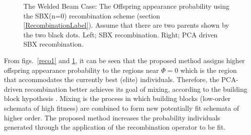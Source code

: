 \begin{figure}[h!]
\begin{minipage}[b]{0.5\linewidth}
 \centering
\end{minipage}
\begin{minipage}[b]{0.5\linewidth}
 \centering
\end{minipage}
\caption{The Welded Beam Case: The  Offspring appearance probability using the SBX(n=0) recombination scheme (section \ref{RecombinationLabel}). Assume that there are two  parents shown by the two black dots. Left; SBX recombination. Right; PCA driven SBX recombination.} 
\label{reco2}
\end{figure}

From figs.\ \ref{reco1} and \ref{reco2}, it can be seen that the proposed method assigns higher offspring appearance probability to the regions near $\Phi=0$ which is the region that accommodates the currently best (elite) individuals. Therefore, the PCA-driven recombination  better achieves its goal of mixing, according to the building block hypothesis \cite{Gold89}. Mixing is the process in which building blocks (low-order schemata of high fitness) are combined to form new potentially fit schemata of higher order. The proposed method increases the probability individuals generated through the application of the recombination operator to be fit.   

